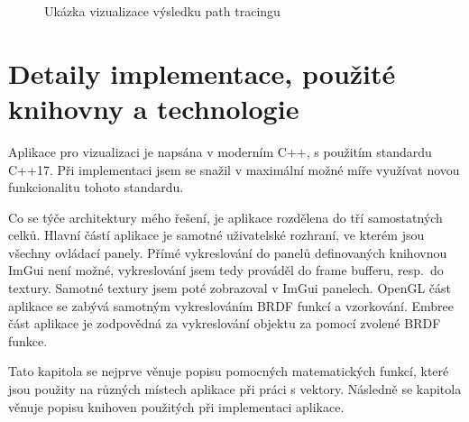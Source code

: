 \documentclass[czech,master]{diploma}
\begin{document}
\begin{figure}[ht]%
  \centering
  \qquad
  \caption{Ukázka vizualizace výsledku path tracingu}%
  \label{fig:finalrender}%
\end{figure}

\clearpage
\section{Detaily implementace, použité knihovny a technologie}
Aplikace pro vizualizaci je napsána v moderním C++, s použitím standardu C++17. Při implementaci jsem se snažil v maximální možné míře využívat novou funkcionalitu tohoto standardu.\par
Co se týče architektury mého řešení, je aplikace rozdělena do tří samostatných celků. Hlavní částí aplikace je samotné uživatelské rozhraní, ve kterém jsou všechny ovládací panely. Přímé vykreslování do panelů definovaných knihovnou ImGui není možné, vykreslování jsem tedy prováděl do frame bufferu, resp.\ do textury. Samotné textury jsem poté zobrazoval v ImGui panelech. OpenGL část aplikace se zabývá samotným vykreslováním BRDF funkcí a vzorkování. Embree část aplikace je zodpovědná za vykreslování objektu za pomocí zvolené BRDF funkce.\par
Tato kapitola se nejprve věnuje popisu pomocných matematických funkcí, které jsou použity na různých místech aplikace při práci s vektory. Následně se kapitola věnuje popisu knihoven použitých při implementaci aplikace.
\end{document}
